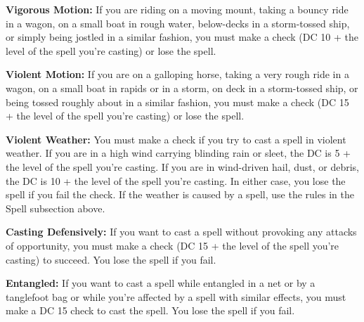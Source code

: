 \textbf{Vigorous Motion:} If you are riding on a moving mount, taking a bouncy ride in a wagon, on a small boat in rough water, below-decks in a storm-tossed ship, or simply being jostled in a similar fashion, you must make a  check (DC 10 + the level of the spell you're casting) or lose the spell.

\textbf{Violent Motion:} If you are on a galloping horse, taking a very rough ride in a wagon, on a small boat in rapids or in a storm, on deck in a storm-tossed ship, or being tossed roughly about in a similar fashion, you must make a  check (DC 15 + the level of the spell you're casting) or lose the spell.

\textbf{Violent Weather:} You must make a  check if you try to cast a spell in violent weather. If you are in a high wind carrying blinding rain or sleet, the DC is 5 + the level of the spell you're casting. If you are in wind-driven hail, dust, or debris, the DC is 10 + the level of the spell you're casting. In either case, you lose the spell if you fail the  check. If the weather is caused by a spell, use the rules in the Spell subsection above.

\textbf{Casting Defensively:} If you want to cast a spell without provoking any attacks of opportunity, you must make a  check (DC 15 + the level of the spell you're casting) to succeed. You lose the spell if you fail.

\textbf{Entangled:} If you want to cast a spell while entangled in a net or by a tanglefoot bag or while you're affected by a spell with similar effects, you must make a DC 15  check to cast the spell. You lose the spell if you fail.